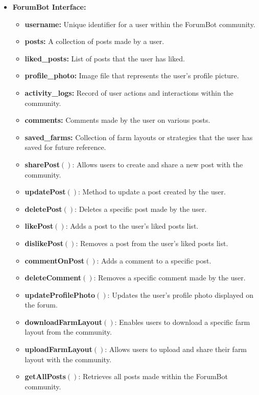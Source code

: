 \begin{itemize}
    \item \textbf{ForumBot Interface:}
        \begin{itemize}
            \item \textbf{username:} Unique identifier for a user within the ForumBot community.
            \item \textbf{posts:} A collection of posts made by a user.
            \item \textbf{liked\_posts:} List of posts that the user has liked.
            \item \textbf{profile\_photo:} Image file that represents the user’s profile picture.
            \item \textbf{activity\_logs:} Record of user actions and interactions within the community.
            \item \textbf{comments:} Comments made by the user on various posts.
            \item \textbf{saved\_farms:} Collection of farm layouts or strategies that the user has saved for future reference.
            \item \textbf{sharePost}$()$: Allows users to create and share a new post with the community.
            \item \textbf{updatePost}$()$: Method to update a post created by the user.
            \item \textbf{deletePost}$()$: Deletes a specific post made by the user.
            \item \textbf{likePost}$()$: Adds a post to the user’s liked posts list.
            \item \textbf{dislikePost}$()$: Removes a post from the user’s liked posts list.
            \item \textbf{commentOnPost}$()$: Adds a comment to a specific post.
            \item \textbf{deleteComment}$()$: Removes a specific comment made by the user.
            \item \textbf{updateProfilePhoto}$()$: Updates the user's profile photo displayed on the forum.
            \item \textbf{downloadFarmLayout}$()$: Enables users to download a specific farm layout from the community.
            \item \textbf{uploadFarmLayout}$()$: Allows users to upload and share their farm layout with the community.
            \item \textbf{getAllPosts}$()$: Retrieves all posts made within the ForumBot community.

\end{itemize}
\end{itemize}
